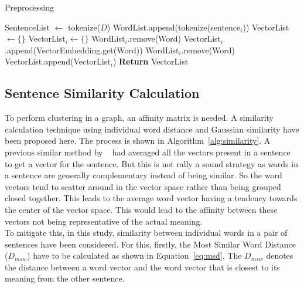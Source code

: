 \begin{algorithm} \caption{Preprocessing} \label{alg:preprocessing}
\begin{algorithmic}[1]
    \State SentenceList $\gets$ tokenize($D$)
        \State WordList.append(tokenize(sentence$_i$))
    \EndFor
    \State VectorList $\gets \{\}$
        \State VectorList$_i \gets \{\}$
                \State WordList$_i$.remove(Word)
                \State VectorList$_i$.append(VectorEmbedding.get(Word))
            \Else
                \State WordList$_i$.remove(Word)
            \EndIf
        \EndFor
        \State VectorList.append(VectorList$_i$)
    \EndFor
    \State \textbf{Return} VectorList
\end{algorithmic}
\end{algorithm}

\subsection{Sentence Similarity Calculation}\label{subsec:sentence-similarity-calculation}
To perform clustering in a graph, an affinity matrix is needed.
A similarity calculation technique using individual word distance and
Gaussian similarity have been proposed here.
The process is shown in Algorithm~\ref{alg:similarity}.
A previous similar method by \citeauthor{roychowdhury-etal-2022-spectral-base}~\cite{roychowdhury-etal-2022-spectral-base}
had averaged all the vectors present in a sentence to get a vector for the sentence.
But this is not rally a sound strategy as words in a sentence are generally complementary instead of being similar.
So the word vectors tend to scatter around in the vector space rather than being grouped closed together.
This leads to the average word vector having a tendency towards the center of the vector space.
This would lead to the affinity between these vectors not being representative of the actual meaning.\\

To mitigate this, in this study, similarity between individual words in a pair of sentences have been considered.
For this, firstly, the Most Similar Word Distance ($D_{msw}$) have to be calculated as shown in Equation~\ref{eq:msd}.
The $D_{msw}$ denotes the distance between a word vector and the word vector that
is closest to its meaning from the other sentence.

